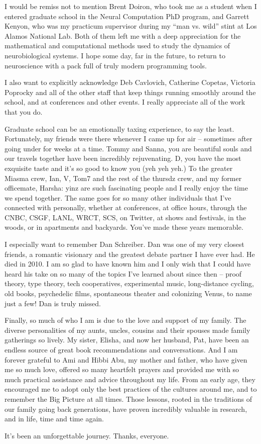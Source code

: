 \documentclass[12pt]{cmuthesis}
\begin{document}
\begin{acknowledgments}
I would be remiss not to mention Brent Doiron, who took me as a student when I entered graduate school in the Neural Computation PhD program, and Garrett Kenyon,  who was my practicum supervisor during my ``man vs. wild'' stint at Los Alamos National Lab. Both of them left me with a deep appreciation for the  mathematical and computational methods used to study the dynamics of neurobiological systems. I hope some day, far in the future, to return to neuroscience with a pack full of truly modern programming tools.

I also want to explicitly acknowledge Deb Cavlovich, Catherine Copetas, Victoria Poprocky and all of the other staff that keep things running smoothly around the school, and at conferences and other events. I really appreciate all of the work that you do.

Graduate school can be an emotionally taxing experience, to say the least. Fortunately, my friends were there whenever I came up for air -- sometimes after going under for weeks at a time. Tommy and Sanna, you are beautiful souls and our travels together have been incredibly rejuvenating. D, you have the most exquisite taste and it's so good to know you (yeh yeh yeh.) To the greater Miasma crew, Ian, V, Tom7 and the rest of the thursdz crew, and my former officemate, Harsha: yinz are such fascinating people and I really enjoy the time we spend together. The same goes for so many other individuals that I've connected with personally, whether at conferences, at office hours, through the CNBC, CSGF, LANL, WRCT, SCS, on Twitter, at shows and festivals, in the woods, or in apartments and backyards. You've made these years memorable.

I especially want to remember Dan Schreiber. Dan was one of my very closest friends, a romantic visionary and the greatest debate partner I have ever had. He died in 2010. I am so glad to have known him and I only wish that I could have heard his take on so many of the topics I've learned about since then -- proof theory, type theory, tech cooperatives, experimental music, long-distance cycling, old books, psychedelic films,  spontaneous theater and colonizing Venus, to name just a few! Dan is truly missed.

Finally, so much of who I am is due to the love and support of my family. The diverse personalities of my aunts, uncles, cousins and their spouses made family gatherings so lively. My sister, Elisha, and now her husband, Pat, have been an endless source of great book recommendations and conversations. And I am forever grateful to Ami and Hibbi Abu, my mother and father, who have given me so much love, offered so many heartfelt prayers and provided me with so much practical assistance and advice throughout my life. From an early age, they encouraged me to adopt only the best practices of the cultures around me, and to remember the Big Picture at all times. Those lessons, rooted in the traditions of our family going back generations, have proven incredibly valuable in research, and in life, time and time again.

It's been an unforgettable journey. Thanks, everyone. 
\end{acknowledgments}
\end{document}
